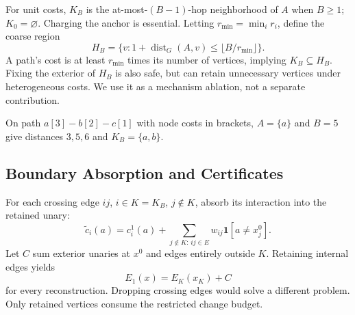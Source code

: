 \documentclass[conference]{IEEEtran}
\newcommand{\ind}{\mathbf{1}}
\begin{document}
For unit costs, $K_B$ is the at-most-$(B-1)$-hop neighborhood of $A$ when $B\geq1$; $K_0=\varnothing$. Charging the anchor is essential. Letting $r_{\min}=\min_i r_i$, define the coarse region
\begin{equation}
 H_B=\{v:1+\operatorname{dist}_G(A,v)\leq\lfloor B/r_{\min}\rfloor\}.
\end{equation}
A path's cost is at least $r_{\min}$ times its number of vertices, implying $K_B\subseteq H_B$. Fixing the exterior of $H_B$ is also safe, but can retain unnecessary vertices under heterogeneous costs. We use it as a mechanism ablation, not a separate contribution.

On path $a[3]-b[2]-c[1]$ with node costs in brackets, $A=\{a\}$ and $B=5$ give distances $3,5,6$ and $K_B=\{a,b\}$.

\subsection{Boundary Absorption and Certificates}
For each crossing edge $ij$, $i\in K=K_B$, $j\notin K$, absorb its interaction into the retained unary:
\begin{equation}
 \widetilde c_i(a)=c_i^1(a)+
 \sum_{j\notin K:\,ij\in E}w_{ij}\ind[a\ne x_j^0].
\end{equation}
Let $C$ sum exterior unaries at $x^0$ and edges entirely outside $K$. Retaining internal edges yields
\begin{equation}
 E_1(x)=E_K(x_K)+C\label{eq:boundary}
\end{equation}
for every reconstruction. Dropping crossing edges would solve a different problem. Only retained vertices consume the restricted change budget.
\end{document}
